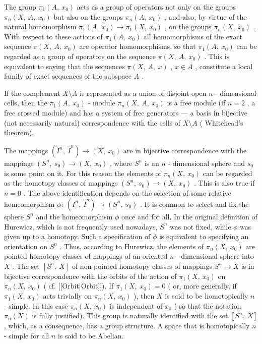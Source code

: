 The group $  \pi _{1} ( A ,\  x _{0} ) $ 
acts as a group of operators not only on the groups $  \pi _{n} ( X ,\  A ,\  x _{0} ) $ 
but also on the groups $  \pi _{n} ( A ,\  x _{0} ) $ , 
and also, by virtue of the natural homomorphism $  \pi _{1} ( A ,\  x _{0} ) \rightarrow \pi _{1} ( X ,\  x _{0} ) $ , 
on the groups $  \pi _{n} ( X ,\  x _{0} ) $ . 
With respect to these actions of $  \pi _{1} ( A ,\  x _{0} ) $ 
all homomorphisms of the exact sequence $  \pi ( X ,\  A ,\  x _{0} ) $ 
are operator homomorphisms, so that $  \pi _{1} ( A ,\  x _{0} ) $ 
can be regarded as a group of operators on the sequence $  \pi ( X ,\  A ,\  x _{0} ) $ . 
This is equivalent to saying that the sequences $  \pi ( X ,\  A ,\  x ) $ , 
$  x \in A $ , 
constitute a local family of exact sequences of the subspace $  A $ .


If the complement $  X \setminus A $ 
is represented as a union of disjoint open $  n $ -
dimensional cells, then the $  \pi _{1} ( A ,\  x _{0} ) $ -
module $  \pi _{n} ( X ,\  A ,\  x _{0} ) $ 
is a free module (if $  n = 2 $ , 
a free crossed module) and has a system of free generators — a basis in bijective (not necessarily natural) correspondence with the cells of $  X \setminus A $ (
Whitehead's theorem).

The mappings $  ( I ^{n} ,\  \dot{I}  ^{n} ) \rightarrow ( X ,\  x _{0} ) $ 
are in bijective correspondence with the mappings $  ( S ^{n} ,\  s _{0} ) \rightarrow ( X ,\  x _{0} ) $ , 
where $  S ^{n} $ 
is an $  n $ -
dimensional sphere and $  s _{0} $ 
is some point on it. For this reason the elements of $  \pi _{n} ( X ,\  x _{0} ) $ 
can be regarded as the homotopy classes of mappings $  ( S ^{n} ,\  s _{0} ) \rightarrow ( X ,\  x _{0} ) $ . 
This is also true if $  n = 0 $ . 
The above identification depends on the selection of some relative homeomorphism $  \phi : \  ( I ^{n} ,\  \dot{I}  ^{n} ) \rightarrow ( S ^{n} ,\  s _{0} ) $ . 
It is common to select and fix the sphere $  S ^{n} $ 
and the homeomorphism $  \phi $ 
once and for all. In the original definition of Hurewicz, which is not frequently used nowadays, $  S ^{n} $ 
was not fixed, while $  \phi $ 
was given up to a homotopy. Such a specification of $  \phi $ 
is equivalent to specifying an orientation on $  S ^{n} $ . 
Thus, according to Hurewicz, the elements of $  \pi _{n} ( X ,\  x _{0} ) $ 
are pointed homotopy classes of mappings of an oriented $  n $ -
dimensional sphere into $  X $ . 
The set $  [ S ^{n} ,\  X ] $ 
of non-pointed homotopy classes of mappings $  S ^{n} \rightarrow X $ 
is in bijective correspondence with the orbits of the action of $  \pi _{1} ( X ,\  x _{0} ) $ 
on $  \pi _{n} ( X ,\  x _{0} ) $ (
cf. [[Orbit|Orbit]]). If $  \pi _{1} ( X ,\  x _{0} ) = 0 $ (
or, more generally, if $  \pi _{1} ( X ,\  x _{0} ) $ 
acts trivially on $  \pi _{n} ( X ,\  x _{0} ) $ ), 
then $  X $ 
is said to be homotopically $  n $ -
simple. In this case $  \pi _{n} ( X ,\  x _{0} ) $ 
is independent of $  x _{0} $ (
so that the notation $  \pi _{n} ( X ) $ 
is fully justified). This group is naturally identified with the set $  [ S ^{n} ,\  X ] $ , 
which, as a consequence, has a group structure. A space that is homotopically $  n $ -
simple for all $  n $ 
is said to be Abelian.

